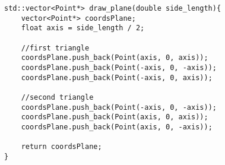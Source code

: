 \begin{lstlisting}
std::vector<Point*> draw_plane(double side_length){
    vector<Point*> coordsPlane;
    float axis = side_length / 2;

    //first triangle
    coordsPlane.push_back(Point(axis, 0, axis));
    coordsPlane.push_back(Point(-axis, 0, -axis));
    coordsPlane.push_back(Point(-axis, 0, axis));

    //second triangle
    coordsPlane.push_back(Point(-axis, 0, -axis));
    coordsPlane.push_back(Point(axis, 0, axis));
    coordsPlane.push_back(Point(axis, 0, -axis));

    return coordsPlane;
}

\end{lstlisting}
